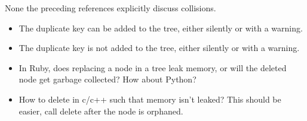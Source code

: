 None the preceding references explicitly discuss collisions.

\begin{itemize}
\item The duplicate key can be added to the tree, either silently or with a warning.
\item The duplicate key is not added to the tree, either silently or with a warning.

\item In Ruby, does replacing a node in a tree leak memory, or will the deleted node
get garbage collected? How about Python?

\item How to delete in c/c++ such that memory isn't leaked? This should be easier,
call delete after the node is orphaned.
\end{itemize}
